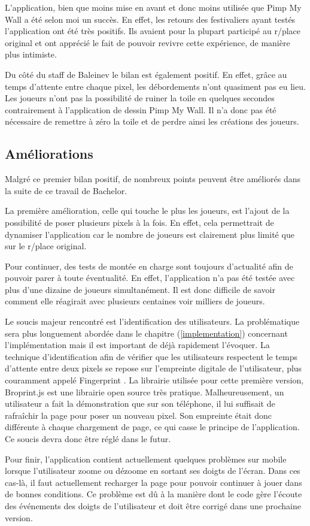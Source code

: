 L'application, bien que moins mise en avant et donc moins utilisée que Pimp My Wall a été selon moi un succès. En effet, les retours des festivaliers ayant testés l'application ont été très positifs. Ils avaient pour la plupart participé au r/place original et ont apprécié le fait de pouvoir revivre cette expérience, de manière plus intimiste.

Du côté du staff de Baleinev le bilan est également positif. En effet, grâce au temps d'attente entre chaque pixel, les débordements n'ont quasiment pas eu lieu. Les joueurs n'ont pas la possibilité de ruiner la toile en quelques secondes contrairement à l'application de dessin Pimp My Wall. Il n'a donc pas été nécessaire de remettre à zéro la toile et de perdre ainsi les créations des joueurs.

\subsection{Améliorations}
\label{poc-ameliorations}

Malgré ce premier bilan positif, de nombreux points peuvent être améliorés dans la suite de ce travail de Bachelor.

La première amélioration, celle qui touche le plus les joueurs, est l'ajout de la possibilité de poser plusieurs pixels à la fois. En effet, cela permettrait de dynamiser l'application car le nombre de joueurs est clairement plus limité que sur le r/place original.

Pour continuer, des tests de montée en charge sont toujours d'actualité afin de pouvoir parer à toute éventualité. En effet, l'application n'a pas été testée avec plus d'une dizaine de joueurs simultanément. Il est donc difficile de savoir comment elle réagirait avec plusieurs centaines voir milliers de joueurs.

Le soucis majeur rencontré est l'identification des utilisateurs. La problématique sera plus longuement abordée dans le chapitre (\ref{implementation}) concernant l'implémentation mais il est important de déjà rapidement l'évoquer. La technique d'identification afin de vérifier que les utilisateurs respectent le temps d'attente entre deux pixels se repose sur l'empreinte digitale de l'utilisateur, plus couramment appelé Fingerprint \cite{devicefingerprint}. La librairie utilisée pour cette première version, Broprint.js \cite{broprintjs} est une librairie open source très pratique. Malheureusement, un utilisateur a fait la démonstration que sur son téléphone, il lui suffisait de rafraîchir la page pour poser un nouveau pixel. Son empreinte était donc différente à chaque chargement de page, ce qui casse le principe de l'application. Ce soucis devra donc être réglé dans le futur.

Pour finir, l'application contient actuellement quelques problèmes sur mobile lorsque l'utilisateur zoome ou dézoome en sortant ses doigts de l'écran. Dans ces cas-là, il faut actuellement recharger la page pour pouvoir continuer à jouer dans de bonnes conditions. Ce problème est dû à la manière dont le code gère l'écoute des événements des doigts de l'utilisateur et doit être corrigé dans une prochaine version.
